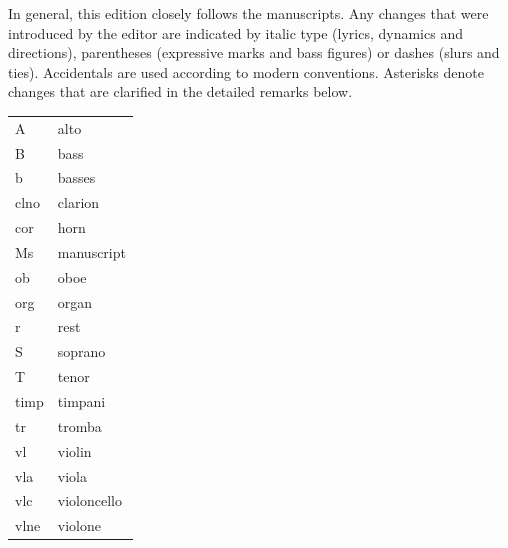 \documentclass[parskip=full]{scrreprt}
\providecommand\printcriticalnotes{}
\providecommand\setscorelayout{}
\providecommand\printscores{}
\begin{document}
\cleardoublepage
\tableofcontents
\cleardoublepage



In general, this edition closely follows the manuscripts. Any changes that were introduced by the editor are indicated by italic type (lyrics, dynamics and directions), parentheses (expressive marks and bass figures) or dashes (slurs and ties). Accidentals are used according to modern conventions. Asterisks denote changes that are clarified in the detailed remarks below.


\begin{tabular}{@{} l l}
  A    & alto \\
  B    & bass \\
  b    & basses \\
  clno & clarion \\
  cor  & horn \\
  Ms   & manuscript \\
  ob   & oboe \\
  org  & organ \\
  r    & rest \\
  S    & soprano \\
  T    & tenor \\
  timp & timpani \\
  tr   & tromba \\
  vl   & violin \\
  vla  & viola \\
  vlc  & violoncello \\
  vlne & violone \\
\end{tabular}

\fi %

\printcriticalnotes



\setscorelayout
\printscores
\end{document}
